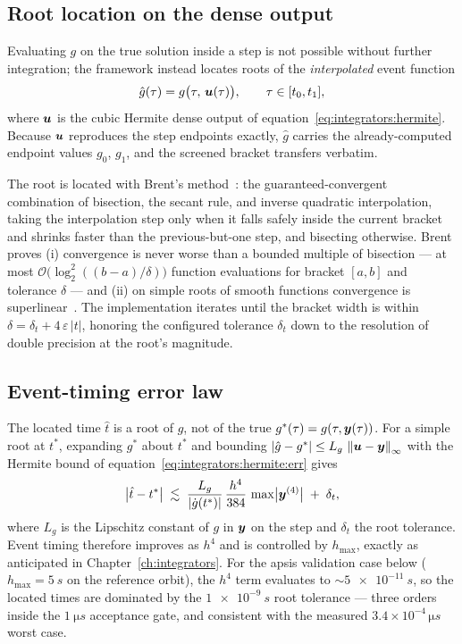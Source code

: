 \subsection{Root location on the dense output}

Evaluating $g$ on the true solution inside a step is not possible without
further integration; the framework instead locates roots of the
\emph{interpolated} event function
\begin{equation}
  \hat{g}(\tau) = g\bigl(\tau,\, \bm{u}(\tau)\bigr),
  \qquad \tau \in [t_0, t_1],
  \label{eq:events:ghat}
\end{equation}
where $\bm{u}$ is the cubic Hermite dense output of
equation~\eqref{eq:integrators:hermite}. Because $\bm{u}$ reproduces the
step endpoints exactly, $\hat{g}$ carries the already-computed endpoint
values $g_0$, $g_1$, and the screened bracket transfers verbatim.

The root is located with Brent's method~\cite{brent1973}: the
guaranteed-convergent combination of bisection, the secant rule, and
inverse quadratic interpolation, taking the interpolation step only when it
falls safely inside the current bracket and shrinks faster than the
previous-but-one step, and bisecting otherwise. Brent proves (i)
convergence is never worse than a bounded multiple of bisection ---
at most $\mathcal{O}\bigl(\log_2^2((b-a)/\delta)\bigr)$ function evaluations
for bracket $[a,b]$ and tolerance $\delta$ --- and (ii) on simple roots of
smooth functions convergence is superlinear~\cite{brent1973}. The
implementation iterates until the bracket width is within
$\delta = \delta_{t} + 4\,\varepsilon\,|t|$, honoring the configured
tolerance $\delta_t$ down to the resolution of double precision at the
root's magnitude.

\subsection{Event-timing error law}
\label{sec:events:timing}

The located time $\hat{t}$ is a root of $\hat{g}$, not of the true
$g^{*}(\tau) = g(\tau, \bm{y}(\tau))$. For a simple root at $t^{*}$,
expanding $g^{*}$ about $t^{*}$ and bounding
$|\hat{g} - g^{*}| \le L_g\,\left\lVert \bm{u} - \bm{y} \right\rVert_{\infty}$ with the
Hermite bound of equation~\eqref{eq:integrators:hermite:err} gives
\begin{equation}
  \bigl|\hat{t} - t^{*}\bigr|
    \;\lesssim\;
    \frac{L_g}{|\dot{g}(t^{*})|}\,
    \frac{h^{4}}{384}\, \max \bigl|\bm{y}^{(4)}\bigr|
    \;+\; \delta_t,
  \label{eq:events:timing}
\end{equation}
where $L_g$ is the Lipschitz constant of $g$ in $\bm{y}$ on the step and
$\delta_t$ the root tolerance. Event timing therefore improves as $h^{4}$
and is controlled by $h_{\max}$, exactly as anticipated in
Chapter~\ref{ch:integrators}. For the apsis validation case below
($h_{\max} = \qty{5}{s}$ on the reference orbit), the $h^4$ term evaluates
to $\sim\qty{5e-11}{s}$, so the located times are dominated by the
$\qty{1e-9}{s}$ root tolerance --- three orders inside the
$\qty{1}{\micro s}$ acceptance gate, and consistent with the measured
$3.4\times10^{-4}\,\unit{\micro s}$ worst case.

